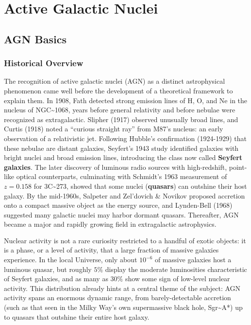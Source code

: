 \chapter{Active Galactic Nuclei} \label{ch:agn}

\section{AGN Basics} \label{sec:agn_basics}

\subsection{Historical Overview} \label{sec:agn_history}

The recognition of active galactic nuclei (AGN) as a distinct astrophysical phenomenon came well before the development of a theoretical framework to explain them. In 1908, Fath detected strong emission lines of H, O, and Ne in the nucleus of NGC\textasciitilde{}1068, years before general relativity and before nebulae were recognized as extragalactic. Slipher (1917) observed unusually broad lines, and Curtis (1918) noted a “curious straight ray” from M87's nucleus: an early observation of a relativistic jet. Following Hubble's confirmation (1924-1929) that these nebulae are distant galaxies, Seyfert's 1943 study identified galaxies with bright nuclei and broad emission lines, introducing the class now called \textbf{Seyfert galaxies}. The later discovery of luminous radio sources with high-redshift, point-like optical counterparts, culminating with Schmidt's 1963 measurement of $z=0.158$ for 3C\textasciitilde{}273, showed that some nuclei (\textbf{quasars}) can outshine their host galaxy. By the mid-1960s, Salpeter and Zel'dovich \& Novikov proposed accretion onto a compact massive object as the energy source, and Lynden-Bell (1968) suggested many galactic nuclei may harbor dormant quasars. Thereafter, AGN became a major and rapidly growing field in extragalactic astrophysics.

\medskip

Nuclear activity is not a rare curiosity restricted to a handful of exotic objects: it is a phase, or a level of activity, that a large fraction of massive galaxies experience. In the local Universe, only about $10^{-6}$ of massive galaxies host a luminous quasar, but roughly $5\%$ display the moderate luminosities characteristic of Seyfert galaxies, and as many as $30\%$ show some sign of low-level nuclear activity. This distribution already hints at a central theme of the subject: AGN activity spans an enormous dynamic range, from barely-detectable accretion (such as that seen in the Milky Way's own supermassive black hole, Sgr\textasciitilde{}A*) up to quasars that outshine their entire host galaxy.

